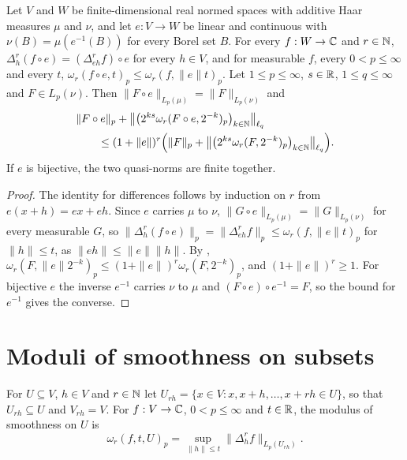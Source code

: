 \begin{lemma}
\label{lem:modulus-linear-equiv}
\leanok
{}
Let $V$ and $W$ be finite-dimensional real normed spaces with additive Haar measures $\mu$ and
$\nu$, and let $e : V \to W$ be linear and continuous with $\nu(B) = \mu(e^{-1}(B))$ for every
Borel set $B$. For every $f : W \to \mathbb{C}$ and $r \in \mathbb{N}$,
$\Delta_h^r (f \circ e) = (\Delta_{e h}^r f) \circ e$ for every $h \in V$, and for measurable $f$,
every $0 < p \leq \infty$ and every $t$, $\omega_r(f \circ e, t)_p \leq \omega_r(f, \|e\| t)_p$.
Let $1 \leq p \leq \infty$, $s \in \mathbb{R}$, $1 \leq q \leq \infty$ and $F \in L_p(\nu)$. Then
$\|F \circ e\|_{L_p(\mu)} = \|F\|_{L_p(\nu)}$ and
\begin{align*}
  &\|F \circ e\|_p
    + \bigl\|\bigl(2^{ks} \omega_r(F \circ e, 2^{-k})_p\bigr)_{k \in \mathbb{N}}\bigr\|_{\ell_q} \\
  &\qquad \leq (1 + \|e\|)^r \Bigl(\|F\|_p
    + \bigl\|\bigl(2^{ks} \omega_r(F, 2^{-k})_p\bigr)_{k \in \mathbb{N}}\bigr\|_{\ell_q}\Bigr) .
\end{align*}
If $e$ is bijective, the two quasi-norms are finite together.
\end{lemma}

\begin{proof}
\leanok
{}
The identity for differences follows by induction on $r$ from $e(x + h) = e x + e h$. Since $e$
carries $\mu$ to $\nu$, $\|G \circ e\|_{L_p(\mu)} = \|G\|_{L_p(\nu)}$ for every measurable $G$, so
$\|\Delta_h^r (f \circ e)\|_p = \|\Delta_{e h}^r f\|_p \leq \omega_r(f, \|e\| t)_p$ for
$\|h\| \leq t$, as $\|e h\| \leq \|e\| \|h\|$. By ,
$\omega_r(F, \|e\| 2^{-k})_p \leq (1 + \|e\|)^r \omega_r(F, 2^{-k})_p$, and
$(1 + \|e\|)^r \geq 1$. For bijective $e$ the inverse $e^{-1}$ carries $\nu$ to $\mu$ and
$(F \circ e) \circ e^{-1} = F$, so the bound for $e^{-1}$ gives the converse.
\end{proof}

\section{Moduli of smoothness on subsets}

\begin{definition}
\label{def:rd-modulus-on}
\leanok
{}
For $U \subseteq V$, $h \in V$ and $r \in \mathbb{N}$ let
$U_{rh} = \{x \in V : x, x + h, \dots, x + rh \in U\}$, so that $U_{rh} \subseteq U$ and
$V_{rh} = V$. For $f : V \to \mathbb{C}$, $0 < p \leq \infty$ and $t \in \mathbb{R}$, the modulus of smoothness
on $U$ is
\[
  \omega_r(f, t, U)_p = \sup_{\|h\| \leq t} \|\Delta_h^r f\|_{L_p(U_{rh})} .
\]
\end{definition}

